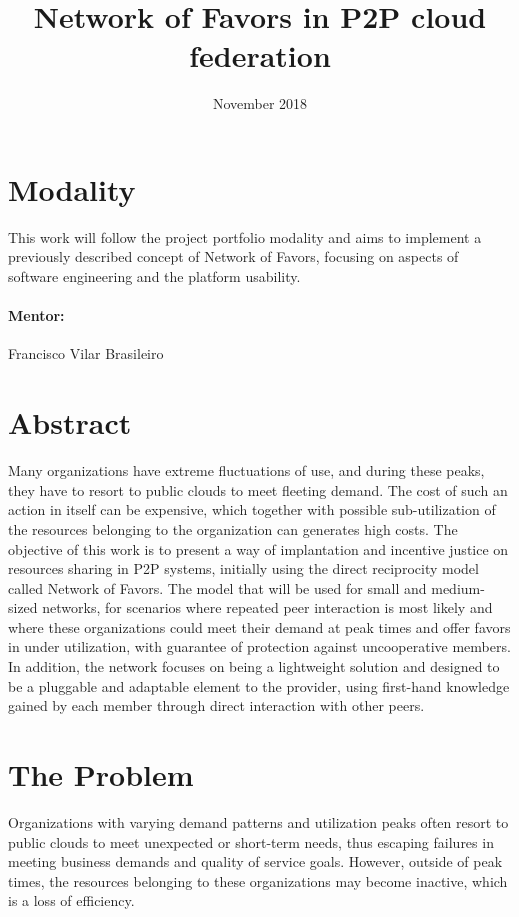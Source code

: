 \documentclass{article}
\title{Network of Favors in P2P cloud federation}
\author{Gustavo Diniz Monteiro \\ \href{gustavo.monteiro@ccc.ufcg.edu.br, gustavo.d.monteiro@icloud.com} }
\date{November 2018}
\begin{document}
\maketitle

\section{Modality}

This work will follow the project portfolio modality and aims to implement a previously described concept of Network of Favors\cite{nof}, focusing on aspects of software engineering and the platform usability.

\paragraph{Mentor:} Francisco Vilar Brasileiro

\section{Abstract}
Many organizations have extreme fluctuations of use, and during these peaks, they have to resort to public clouds to meet fleeting demand. The cost of such an action in itself can be expensive, which together with possible sub-utilization of the resources belonging to the organization can generates high costs. The objective of this work is to present a way of implantation and incentive justice on resources sharing in P2P systems, initially using the direct reciprocity model called Network of Favors. The model that will be used for small and medium-sized networks, for scenarios where repeated peer interaction is most likely and where these organizations could meet their demand at peak times and offer favors in under utilization, with guarantee of protection against uncooperative members. In addition, the network focuses on being a lightweight solution and designed to be a pluggable and adaptable element to the provider, using first-hand knowledge gained by each member through direct interaction with other peers.

\section{The Problem}
Organizations with varying demand patterns and utilization peaks often resort to public clouds to meet unexpected or short-term needs, thus escaping failures in meeting business demands and quality of service goals.
However, outside of peak times, the resources belonging to these organizations may become inactive, which is a loss of efficiency.
\end{document}
